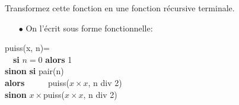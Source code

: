 \documentclass[10pt]{article}\usepackage[correction]{esial}
\begin{document}
\begin{Question}
  Transformez cette fonction en une fonction récursive terminale.
\end{Question}
\begin{Reponse}
  \begin{itemize}
  \item[$\bullet$] On l'écrit sous forme fonctionnelle:
  \end{itemize}

  \begin{tabbing}
    puiss(x, n)=\\
    ~~\=\textbf{si} $n=0$ \=\textbf{alors} 1\\
    \>\>\textbf{sinon} \=\textbf{si} pair(n)\\
    \>\>\>\textbf{alors} ~~~~~puiss($x\times x$, n div 2)\\
    \>\>\>\textbf{sinon} $x\times $puiss($x\times x$, n div 2)\\
  \end{tabbing}


\end{Reponse}
\end{document}
